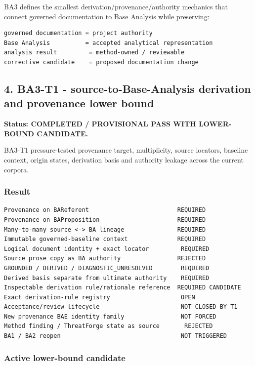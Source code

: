 \documentclass[11pt,a4paper]{article}
\begin{document}
BA3 defines the smallest derivation/provenance/authority mechanics that connect governed documentation to Base Analysis while preserving:

\begin{verbatim}
governed documentation = project authority
Base Analysis          = accepted analytical representation
analysis result         = method-owned / reviewable
corrective candidate    = proposed documentation change
\end{verbatim}

\subsection{4. BA3-T1 - source-to-Base-Analysis derivation and provenance lower bound}\label{4-ba3-t1---source-to-base-analysis-derivation-and-provenance-lower-bound}

\textbf{Status: COMPLETED / PROVISIONAL PASS WITH LOWER-BOUND CANDIDATE.}

BA3-T1 pressure-tested provenance target, multiplicity, source locators, baseline context, origin states, derivation basis and authority leakage across the current corpora.

\subsubsection{Result}\label{result}

\begin{verbatim}
Provenance on BAReferent                         REQUIRED
Provenance on BAProposition                      REQUIRED
Many-to-many source <-> BA lineage               REQUIRED
Immutable governed-baseline context              REQUIRED
Logical document identity + exact locator         REQUIRED
Source prose copy as BA authority                REJECTED
GROUNDED / DERIVED / DIAGNOSTIC_UNRESOLVED        REQUIRED
Derived basis separate from ultimate authority    REQUIRED
Inspectable derivation rule/rationale reference  REQUIRED CANDIDATE
Exact derivation-rule registry                    OPEN
Acceptance/review lifecycle                       NOT CLOSED BY T1
New provenance BAE identity family                NOT FORCED
Method finding / ThreatForge state as source       REJECTED
BA1 / BA2 reopen                                  NOT TRIGGERED
\end{verbatim}

\subsubsection{Active lower-bound candidate}\label{active-lower-bound-candidate}
\end{document}
